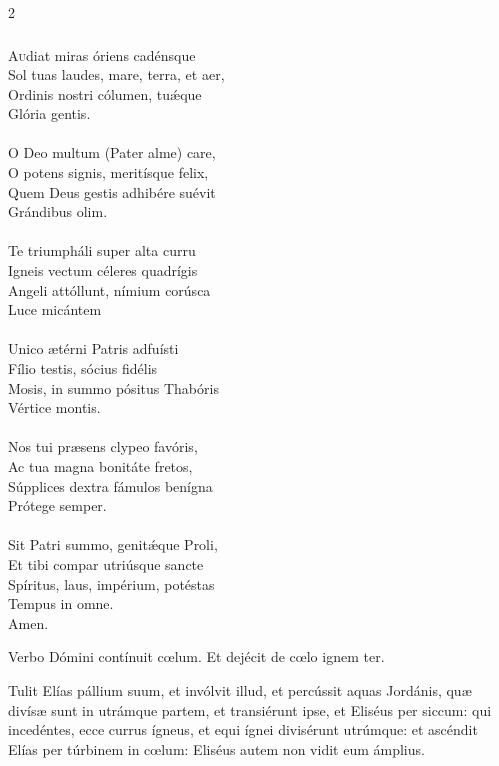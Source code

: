 \documentclass[9pt,twoside]{extarticle}
\begin{document}
\begin{multicols}{2}
\subsubsection*{\center {}}
\lettrine{A}udiat miras óriens cadénsque\\
Sol tuas laudes, mare, terra, et aer,\\
Ordinis nostri cólumen, tuǽque\\
Glória gentis.\\
\\
O Deo multum (Pater alme) care,\\
O potens signis, meritísque felix,\\
Quem Deus gestis adhibére suévit\\
Grándibus olim.\\
\\
Te triumpháli super alta curru\\
Igneis vectum céleres quadrígis\\
Angeli attóllunt, nímium corúsca\\
Luce micántem\\
\\
Unico ætérni Patris adfuísti\\
Fílio testis, sócius fidélis\\
Mosis, in summo pósitus Thabóris\\
Vértice montis.\\
\\
Nos tui præsens clypeo favóris,\\
Ac tua magna bonitáte fretos,\\
Súpplices dextra fámulos benígna\\
Prótege semper.\\
\\
Sit Patri summo, genitǽque Proli,\\
Et tibi compar utriúsque sancte\\
Spíritus, laus, impérium, potéstas\\
Tempus in omne.\\
Amen.

\begin{tightlist}
\item {} Verbo Dómini contínuit cœlum.  Et dejécit de cœlo ignem ter.
\item {} Tulit Elías pállium suum, et invólvit illud, et percússit aquas Jordánis, quæ divísæ sunt in utrámque partem, et transiérunt ipse, et Eliséus per siccum: qui incedéntes, ecce currus ígneus, et equi ígnei divisérunt utrúmque: et ascéndit Elías per túrbinem in cœlum: Eliséus autem non vidit eum ámplius.
\end{tightlist}


\end{multicols}
\end{document}
